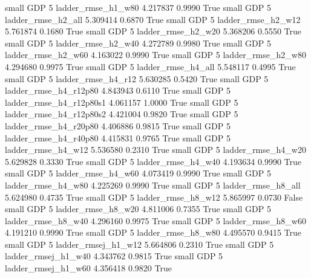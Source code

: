     small      GDP                 5       ladder_rmse_h1_w80   4.217837      0.9990    True
     small      GDP                 5       ladder_rmse_h2_all   5.309414      0.6870    True
     small      GDP                 5       ladder_rmse_h2_w12   5.761874      0.1680    True
     small      GDP                 5       ladder_rmse_h2_w20   5.368206      0.5550    True
     small      GDP                 5       ladder_rmse_h2_w40   4.272789      0.9980    True
     small      GDP                 5       ladder_rmse_h2_w60   4.163022      0.9990    True
     small      GDP                 5       ladder_rmse_h2_w80   4.294680      0.9975    True
     small      GDP                 5       ladder_rmse_h4_all   5.548117      0.4995    True
     small      GDP                 5       ladder_rmse_h4_r12   5.630285      0.5420    True
     small      GDP                 5    ladder_rmse_h4_r12p80   4.843943      0.6110    True
     small      GDP                 5  ladder_rmse_h4_r12p80s1   4.061157      1.0000    True
     small      GDP                 5  ladder_rmse_h4_r12p80s2   4.421004      0.9820    True
     small      GDP                 5    ladder_rmse_h4_r20p80   4.406886      0.9815    True
     small      GDP                 5    ladder_rmse_h4_r40p80   4.415831      0.9765    True
     small      GDP                 5       ladder_rmse_h4_w12   5.536580      0.2310    True
     small      GDP                 5       ladder_rmse_h4_w20   5.629828      0.3330    True
     small      GDP                 5       ladder_rmse_h4_w40   4.193634      0.9990    True
     small      GDP                 5       ladder_rmse_h4_w60   4.073419      0.9990    True
     small      GDP                 5       ladder_rmse_h4_w80   4.225269      0.9990    True
     small      GDP                 5       ladder_rmse_h8_all   5.624980      0.4735    True
     small      GDP                 5       ladder_rmse_h8_w12   5.865997      0.0730   False
     small      GDP                 5       ladder_rmse_h8_w20   4.811006      0.7355    True
     small      GDP                 5       ladder_rmse_h8_w40   4.296160      0.9975    True
     small      GDP                 5       ladder_rmse_h8_w60   4.191210      0.9990    True
     small      GDP                 5       ladder_rmse_h8_w80   4.495570      0.9415    True
     small      GDP                 5      ladder_rmsej_h1_w12   5.664806      0.2310    True
     small      GDP                 5      ladder_rmsej_h1_w40   4.343762      0.9815    True
     small      GDP                 5      ladder_rmsej_h1_w60   4.356418      0.9820    True
